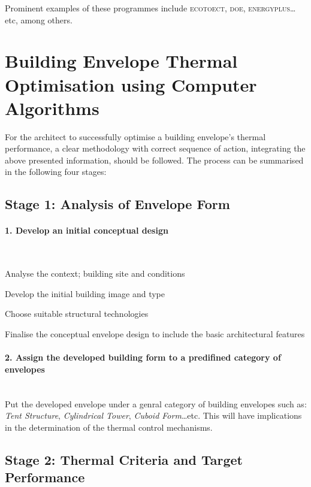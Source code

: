 \documentclass[11pt,a4paper,oneside]{article}
\begin{document}
\begin{multicols}{2}
Prominent examples of these programmes include \textsc{ecotoect, doe, energyplus}\ldots{}etc, among others.

\section{Building Envelope Thermal Optimisation using Computer Algorithms}

For the architect to successfully optimise a building envelope's thermal performance, a clear methodology with correct sequence of action, integrating the above presented information, should be followed. The process can be summarised in the following four stages:

\subsection*{Stage 1: Analysis of Envelope Form}

\paragraph{1. Develop an initial conceptual design}\mbox{}\\
\begin{compactitem}
	\item Analyse the context; building site and conditions
	\item Develop the initial building image and type
	\item Choose suitable structural technologies
	\item Finalise the conceptual envelope design to include the basic architectural features
\end{compactitem}

\paragraph{2. Assign the developed building form to a predifined category of envelopes}\mbox{}\\

Put the developed envelope under a genral category of building envelopes such as: \emph{Tent Structure}, \emph{Cylindrical Tower}, \emph{Cuboid Form}\ldots{}etc. This will have implications in the determination of the thermal control mechanisms.

\subsection*{Stage 2: Thermal Criteria and Target Performance}


\end{multicols}
\end{document}
